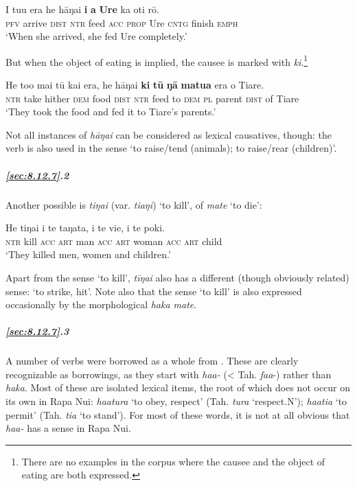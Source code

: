 \ea\label{ex:8.255}
\gll I tu{\ꞌ}u era he hāŋai \textbf{i} \textbf{a} \textbf{Ure} ka oti rō. \\
\textsc{pfv} arrive \textsc{dist} \textsc{ntr} feed \textsc{acc} \textsc{prop} Ure \textsc{cntg} finish \textsc{emph} \\

\glt
‘When she arrived, she fed Ure completely.’ \textstyleExampleref{[R310.291]} 
\z

But when the object of eating is implied, the causee is marked with \textit{ki}.\footnote{\label{fn:458}There are no examples in the corpus where the causee and the object of eating are both expressed.}

\ea\label{ex:8.256}
\gll He to{\ꞌ}o mai tū kai era, he hāŋai \textbf{ki} \textbf{tū} \textbf{ŋā} \textbf{matu{\ꞌ}a} era o Tiare. \\
\textsc{ntr} take hither \textsc{dem} food \textsc{dist} \textsc{ntr} feed to \textsc{dem} \textsc{pl} parent \textsc{dist} of Tiare \\

\glt
‘They took the food and fed it to Tiare’s parents.’ \textstyleExampleref{[R238.009]} 
\z

Not all instances of \textit{hāŋai} can be considered as lexical causatives, though: the verb is also used in the sense ‘to raise/tend (animals); to raise/rear (children)’.

\subparagraph{\ref{sec:8.12.7}.2} Another possible  is \textit{tiŋa{\ꞌ}i} (var. \textit{tiaŋi}) ‘to kill’,  of \textit{mate} ‘to die’:

\ea\label{ex:8.257}
\gll He tiŋa{\ꞌ}i i te taŋata, i te vi{\ꞌ}e, i te poki.\\
\textsc{ntr} kill \textsc{acc} \textsc{art} man \textsc{acc} \textsc{art} woman \textsc{acc} \textsc{art} child\\

\glt
‘They killed men, women and children.’ \textstyleExampleref{[Mtx-3-01.250]}
\z

Apart from the sense ‘to kill’, \textit{tīŋa{\ꞌ}i} also has a different (though obviously related) sense: ‘to strike, hit’. Note also that the sense ‘to kill’ is also expressed occasionally by the morphological  \textit{haka mate}.

\subparagraph{\ref{sec:8.12.7}.3} A number of  verbs were borrowed as a whole from . These are clearly recognizable as borrowings, as they start with \textit{ha{\ꞌ}a-} ({\textless} Tah. \textit{fa{\ꞌ}a}{}-) rather than \textit{haka}. Most of these are isolated lexical items, the root of which does not occur on its own in Rapa Nui: \textit{ha{\ꞌ}atura} ‘to obey, respect’ (Tah. \textit{tura} ‘respect.N’); \textit{ha{\ꞌ}ati{\ꞌ}a} ‘to permit’ (Tah. \textit{ti{\ꞌ}a} ‘to stand’). For most of these words, it is not at all obvious that \textit{ha{\ꞌ}a-} has a  sense in Rapa Nui.

